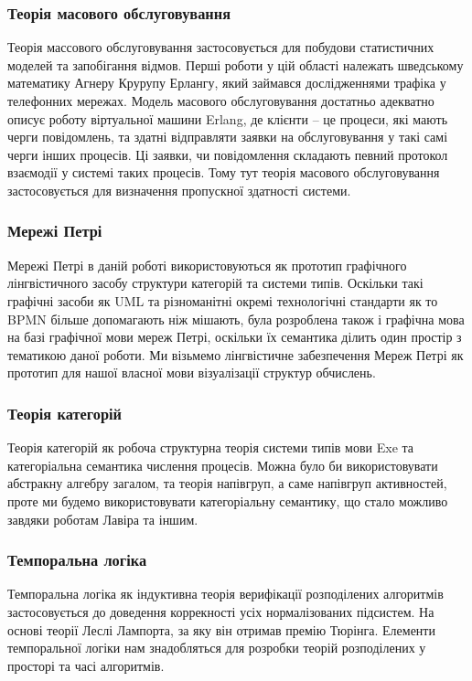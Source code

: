 \documentclass[11pt,oneside]{article}
\begin{document}
   \subsubsection*{Теорія масового обслуговування}
   Теорія массового обслуговування застосовується для побудови
   статистичних моделей та запобігання відмов. Перші роботи у цій області
   належать шведському математику Агнеру Крурупу Ерлангу, який займався
   дослідженнями трафіка у телефонних мережах. Модель масового обслуговування достатньо
   адекватно описує роботу віртуальної машини Erlang, де клієнти -- це процеси,
   які мають черги повідомлень, та здатні відправляти заявки на обслуговування
   у такі самі черги інших процесів. Ці заявки, чи повідомлення складають певний
   протокол взаємодії у системі таких процесів. Тому тут теорія масового обслуговування
   застосовується для визначення пропускної здатності системи.

   \subsubsection*{Мережі Петрі}
   Мережі Петрі в даній роботі використовуються як прототип графічного
   лінгвістичного засобу структури категорій та системи типів. Оскільки
   такі графічні засоби як UML та різноманітні окремі технологічні
   стандарти як то BPMN більше допомагають ніж мішають, була розроблена
   також і графічна мова на базі графічної мови мереж Петрі, оскільки їх
   семантика ділить один простір з тематикою даної роботи. Ми візьмемо
   лінгвістичне забезпечення Мереж Петрі як прототип для нашої власної
   мови візуалізації структур обчислень.

   \subsubsection*{Теорія категорій}
   Теорія категорій як робоча структурна теорія системи типів мови Exe та
   категоріальна семантика числення процесів. Можна було би використовувати абстракну алгебру загалом,
   та теорія напівгруп, а саме напівгруп активностей, проте ми будемо використовувати
   категоріальну семантику, що стало можливо завдяки роботам Лавіра та іншим.\\

   \subsubsection*{Темпоральна логіка}
   Темпоральна логіка як індуктивна теорія верифікації розподілених алгоритмів
   застосовується до доведення коррекності усіх нормалізованих підсистем. На основі
   теорії  Леслі Лампорта\cite{tla}, за яку він отримав премію Тюрінга.
   Елементи темпоральної логіки нам знадобляться для розробки теорій
   розподілених у просторі та часі алгоритмів.\\
\end{document}
